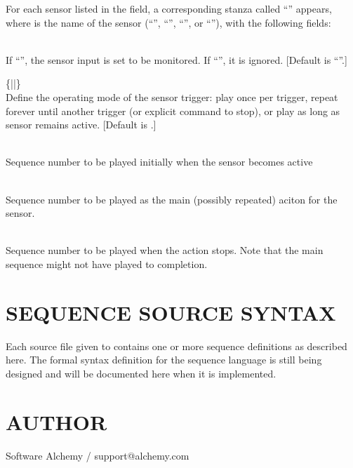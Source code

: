 For each sensor listed in the 
field, a corresponding stanza called 
``''
appears, where 
is the name of the sensor 
(``'',
``'',
``'',
or
``''),
with the following fields:
\begin{list}{}{}
\item[{\codetype{enabled=}\Var*{bool}}]\hfill\\
If 
``'',
the sensor input is set to be monitored.  If
``'',
it is ignored.  [Default is 
``''.]
\item[{\codetype{mode=}\{\codetype{once}|\codetype{repeat}|\codetype{while}\}}]\hfill\\
Define the operating mode of the sensor trigger: play once per trigger,
repeat forever until another trigger (or explicit command to stop), or
play as long as sensor remains active. [Default is 
.]
\item[{\codetype{setup=}\Var*{id}}]\hfill\\
Sequence
number to be played initially when the sensor becomes active
\item[{\codetype{sequence=}\Var*{id}}]\hfill\\
Sequence
number to be played as the main (possibly repeated) aciton for the sensor.
\item[{\codetype{terminate=}\Var*{id}}]\hfill\\
Sequence
number to be played when the action stops. Note that the
main sequence might not have played to completion.
\end{list}
\section*{SEQUENCE SOURCE SYNTAX}


Each source file given to 
contains one or more sequence definitions as described here.  The formal syntax
definition for the sequence language is still being designed and will be documented
here when it is implemented.
\section*{AUTHOR}


Software Alchemy / support@alchemy.com
